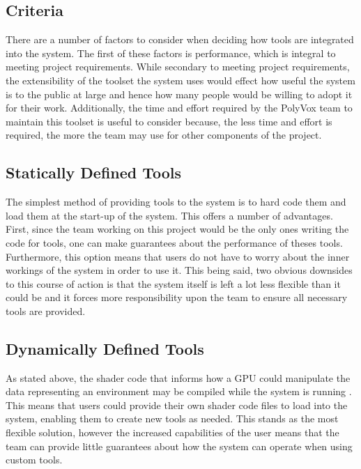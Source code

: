 \documentclass[onecolumn, draftclsnofoot,10pt, compsoc]{IEEEtran}
\begin{document}
\subsection{Criteria}

There are a number of factors to consider when deciding how tools are integrated into the system.
The first of these factors is performance, which is integral to meeting project requirements.
While secondary to meeting project requirements, the extensibility of the toolset the system uses would effect how useful the system is to the public at large and hence how many people would be willing to adopt it for their work.
Additionally, the time and effort required by the PolyVox team to maintain this toolset is useful to consider because, the less time and effort is required, the more the team may use for other components of the project.


\subsection{Statically Defined Tools}

The simplest method of providing tools to the system is to hard code them and load them at the start-up of the system.
This offers a number of advantages.
First, since the team working on this project would be the only ones writing the code for tools, one can make guarantees about the performance of theses tools.
Furthermore, this option means that users do not have to worry about the inner workings of the system in order to use it.
This being said, two obvious downsides to this course of action is that the system itself is left a lot less flexible than it could be and it forces more responsibility upon the team to ensure all necessary tools are provided.


\subsection{Dynamically Defined Tools}

As stated above, the shader code that informs how a GPU could manipulate the data representing an environment may be compiled while the system is running \cite{4}.
This means that users could provide their own shader code files to load into the system, enabling them to create new tools as needed.
This stands as the most flexible solution, however the increased capabilities of the user means that the team can provide little guarantees about how the system can operate when using custom tools.
\end{document}
